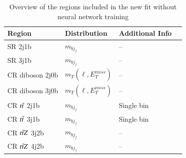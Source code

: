 \begin{table}[h!]
     \centering
      {\footnotesize \begin{tabular}{@{} *4l  @{}}
      \toprule
       Region & Distribution & Additional Info \\
     \midrule
      SR 2j1b & $m_{bj_{f}}$ & {--}\\[0.2ex]
      SR 3j1b & $m_{bj_{f}}$ & {--}\\[0.2ex]
      CR diboson 2j0b & $m_{T}(\ell,E_{T}^{miss})$ & {--}\\[0.2ex]
      CR diboson 3j0b & $m_{T}(\ell,E_{T}^{miss})$ & {--}\\[0.2ex]
      CR $t\Bar{t}$ 2j1b & $m_{bj_{f}}$ & Single bin \\[0.2ex]
      CR $t\Bar{t}$ 3j1b & $m_{bj_{f}}$ & Single bin \\[0.2ex]
      CR $t\Bar{t}Z$ 3j2b & $m_{bj_{f}}$ & {--}\\[0.2ex]
      CR $t\Bar{t}Z$ 4j2b & $m_{bj_{f}}$ & {--}\\[0.2ex]
      \bottomrule
 \end{tabular}}
 \caption{Overview of the regions included in the new fit without neural network training}
 \label{tab:newfittedregions}
 \end{table}
 
